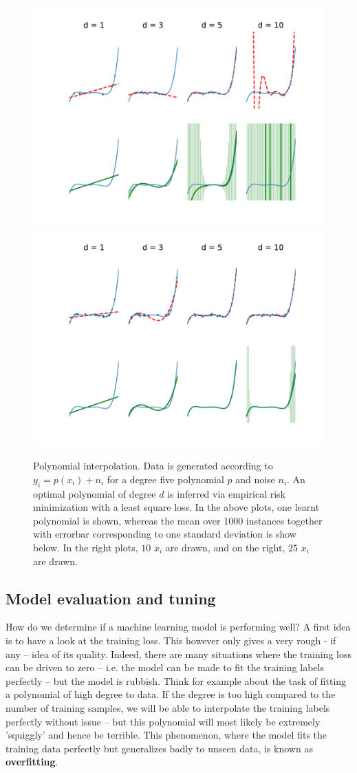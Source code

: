 \documentclass{article}
\begin{document}
\begin{figure}
    \centering
    \includegraphics[width=0.49\linewidth]{graphics/poly_fit.pdf}\includegraphics[width=0.49\linewidth]{graphics/poly_fit_large_n.pdf}
    \caption{Polynomial interpolation. Data is generated according to $y_i = p(x_i)+n_i$ for a degree five polynomial $p$ and noise $n_i$. An optimal polynomial of degree $d$ is inferred via empirical risk minimization with a least square loss. In the above plots, one learnt polynomial is shown, whereas the mean over 1000 instances together with errorbar corresponding to one standard deviation is show below. In the right plots, $10$ $x_i$ are drawn, and on the right, $25$ $x_i$ are drawn.}
    \label{fig:poly}
\end{figure}


\subsection{Model evaluation and tuning}
How do we determine if a machine learning model is performing well? A first idea is to have a look at the training loss. This however only gives a very rough - if any -- idea of its quality. Indeed, there are many situations where the training loss can be driven to zero -- i.e. the model can be made to fit the training labels perfectly -- but the model is rubbish. Think for example about the task of fitting a polynomial of high degree to data. If the degree is too high compared to the number of training samples, we will be able to interpolate the training labels perfectly without issue -- but this polynomial will most likely be extremely 'squiggly' and hence be terrible. This phenomenon, where the model fits the training data perfectly but generalizes badly to unseen data, is known as \textbf{overfitting}. 
\end{document}
